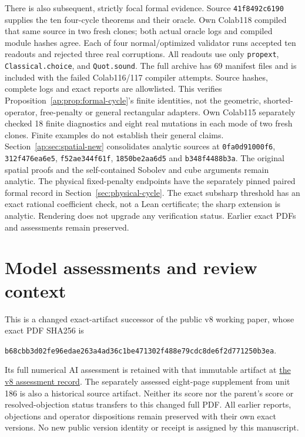 \documentclass[11pt]{article}
\begin{document}
There is also subsequent, strictly focal formal evidence. Source
\texttt{41f8492c6190} supplies the ten four-cycle theorems and their oracle.
Own Colab118 compiled that same source in two fresh clones; both actual oracle logs
and compiled module hashes agree. Each of four normal/optimized validator runs
accepted ten readouts and rejected three real corruptions. All readouts use only
\texttt{propext}, \texttt{Classical.choice}, and \texttt{Quot.sound}.
The full archive has 69 manifest files and is included with the failed Colab116/117
compiler attempts. Source hashes, complete logs and exact reports are allowlisted.
This verifies Proposition~\ref{ap:prop:formal-cycle}'s finite identities, not the
geometric, shorted-operator, free-penalty or general rectangular adapters.
Own Colab115 separately checked 18 finite diagnostics and eight real mutations in
each mode of two fresh clones. Finite examples do not establish their general claims.
Section~\ref{ap:sec:spatial-new} consolidates analytic sources at
\texttt{0fa0d91000f6}, \texttt{312f476ea6e5}, \texttt{f52ae344f61f},
\texttt{1850be2aa6d5} and \texttt{b348f4488b3a}. The original spatial proofs and the self-contained Sobolev and cube
arguments remain analytic. The physical fixed-penalty endpoints have the
separately pinned paired formal record in Section~\ref{sec:physical-cycle}.
The exact subsharp threshold has an exact rational coefficient check, not a
Lean certificate; the sharp extension is analytic. Rendering does not upgrade
any verification status. Earlier exact PDFs and assessments remain preserved.

\section{Model assessments and review context}\label{sec:model-context}
This is a changed exact-artifact successor of the public v8 working paper,
whose exact PDF SHA256 is
\begin{center}\scriptsize\texttt{b68cbb3d02fe96edae263a4ad36c1be471302f488e79cdc8de6f2d771250b3ea}.\end{center}
Its full numerical AI assessment is retained with that immutable artifact at
\href{https://airr.science/papers/ARR-2026-7EPM3V3DP796BBRR/versions/v8/\#model-assessments}{the v8 assessment record}.
The separately assessed eight-page supplement from unit 186 is also a
historical source artifact. Neither its score nor the parent's score or
resolved-objection status transfers to this changed full PDF. All earlier
reports, objections and operator dispositions remain preserved with their
own exact versions. No new public version identity or receipt is assigned
by this manuscript.
\end{document}
